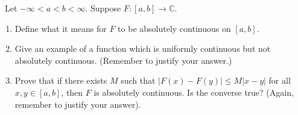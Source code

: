 \documentclass[12pt]{Qual}
\begin{document}
\begin{problem} $\,$
Let $-\infty<a<b<\infty$. Suppose $F:[a,b]\to\mathbb{C}$.
\begin{enumerate}[label=(\alph*)]
    \item Define what it means for $F$ to be absolutely continuous on $[a,b]$.
    \item Give an example of a function which is uniformly continuous but not absolutely continuous. (Remember to justify your answer.)
    \item Prove that if there exists $M$ such that $|F(x)-F(y)|\le M|x-y|$ for all $x,y\in[a,b]$, then $F$ is absolutely continuous. Is the converse true? (Again, remember to justify your answer).
\end{enumerate}
\end{problem}
\end{document}
